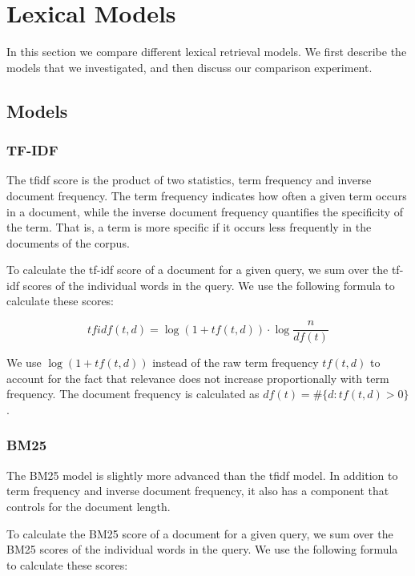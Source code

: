 \section{Lexical Models}

In this section we compare different lexical retrieval models.
We first describe the models that we investigated,
and then discuss our comparison experiment.

\subsection{Models}


\subsubsection{TF-IDF}

The tf\textendash idf score is the product of two statistics, 
term frequency and inverse document frequency.
The term frequency indicates how often a given term occurs in a document,
while the inverse document frequency quantifies the specificity of the term.
That is, a term is more specific if it occurs less frequently in the documents of the corpus.  

To calculate the tf-idf score of a document for a given query, 
we sum over the tf-idf scores of the individual words in the query.
We use the following formula to calculate these scores: 

\begin{equation*}
tfidf(t,d) = \log(1 + tf(t,d)) \cdot \log\frac{n}{df(t)}
\end{equation*}

We use $\log(1 + tf(t,d))$ instead of the raw term frequency $tf(t,d)$
to account for the fact that relevance	does not increase proportionally with term	
frequency. The document frequency is calculated as $df(t) = \#\{d:tf(t,d) > 0\}$.


\subsubsection{BM25}

The BM25 model is slightly more advanced than the tf\textendash idf model.
In addition to term frequency and inverse document frequency,
it also has a component that controls for the document length.

To calculate the BM25 score of a document for a given query, 
we sum over the BM25 scores of the individual words in the query.
We use the following formula to calculate these scores: 

